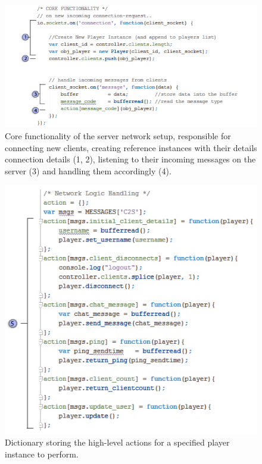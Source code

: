 \documentclass[bsc, 12pt, twoside, singlespacing, parskip, abbrevs, notimes, normalheadings, logo]{styles/infthesis}
\begin{document}
\begin{figure}[H]
	\includegraphics[scale=0.72]{images/server_code.jpg}
	\caption{Core functionality of the server network setup, responsible for connecting new clients, creating reference instances with their details connection details (1, 2), listening to their incoming messages on the server (3) and handling them accordingly (4). }
	\label{fig:server_core}
\end{figure}
\vspace{2em}
\begin{figure}[H]
	\includegraphics[scale=0.65]{images/server_actions.jpg}
	\caption{Dictionary storing the high-level actions for a specified player instance to perform.}
	\label{fig:server_actions}
\end{figure}
\end{document}

